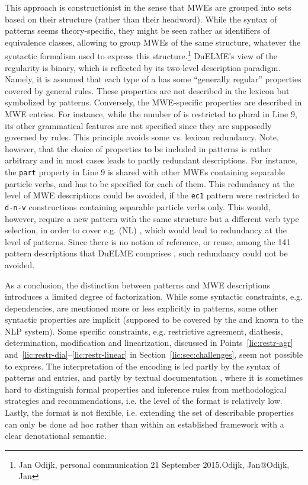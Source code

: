 \documentclass[output=paper]{langsci/langscibook}
\begin{document}
This approach is constructionist in the sense that MWEs are grouped into sets based on their structure (rather than their headword). While the syntax of patterns seems theory-specific, they might be seen rather as identifiers of equivalence classes, allowing to group MWEs of the same structure, whatever the syntactic formalism used to express this structure.\footnote{Jan Odijk, personal communication 21 September 2015.{Odijk, Jan@Odijk, Jan}} DuELME's view of the regularity is binary, which is reflected by its two-level description paradigm. Namely, it is assumed that each type of a  has some ``generally regular'' properties covered by general  rules. These properties are not described in the lexicon but symbolized by patterns. Conversely, the MWE-specific properties are described in MWE entries. For instance, while the number of  is restricted to plural in Line 9, its other grammatical features are not specified since they are supposedly governed by  rules. This principle avoids some  vs. lexicon redundancy. Note, however, that the choice of properties to be included in patterns is rather arbitrary and in most cases leads to partly redundant descriptions. For instance, the \texttt{part} property in Line 9 is shared with other MWEs containing separable particle verbs, and has to be specified for each of them. This redundancy at the level of MWE descriptions could be avoided, if the \texttt{ec1} pattern were restricted to \texttt{d-n-v} constructions containing separable particle verbs only. This would, however, require a new pattern with the same structure but a different verb type selection, in order to cover e.g. (NL) , which would lead to redundancy at the level of patterns. Since there is no notion of reference, or reuse, among the 141 pattern descriptions that DuELME comprises \citep{gregoire:07}, such redundancy could not be avoided.

As a conclusion, the distinction between patterns and MWE descriptions introduces a limited degree of factorization. While some syntactic constraints, e.g. dependencies, are mentioned more or less explicitly in patterns, some other syntactic properties are implicit (supposed to be covered by the  and known to the NLP system). Some specific constraints, e.g. restrictive agreement, diathesis, determination, modification and linearization, discussed in Points~\ref{lic:restr-agr} and~\ref{lic:restr-dia}--\ref{lic:restr-linear} in Section~\ref{lic:sec:challenges}, seem not possible to express. The interpretation of the encoding is led partly by the syntax of patterns and entries, and partly by textual documentation \citep{gregoire:07c}, where it is sometimes hard to distinguish formal properties and inference rules from methodological strategies and recommendations, i.e. the  level of the format is relatively low. Lastly, the format is not flexible, i.e. extending the set of describable properties can only be done ad hoc rather than within an established framework with a clear denotational semantic.
\end{document}
